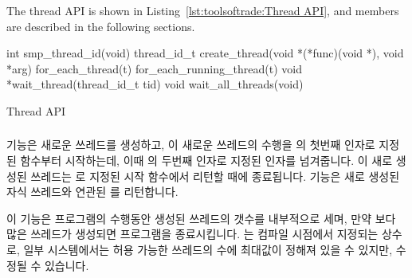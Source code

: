 The thread API is shown in
Listing~\ref{lst:toolsoftrade:Thread API}, and members are described in the
following sections.
\fi

\begin{listing*}[tbp]
{ \scriptsize
\begin{verbbox}
int smp_thread_id(void)
thread_id_t create_thread(void *(*func)(void *), void *arg)
for_each_thread(t)
for_each_running_thread(t)
void *wait_thread(thread_id_t tid)
void wait_all_threads(void)
\end{verbbox}
}
\centering
\theverbbox
\caption{Thread API}
\label{lst:toolsoftrade:Thread API}
\end{listing*}

\subsubsection{}

 기능은 새로운 쓰레드를 생성하고, 이 새로운 쓰레드의 수행을
 의 첫번째 인자로 지정된  함수부터 시작하는데,
이때  의 두번째 인자로 지정된 인자를 넘겨줍니다.
이 새로 생성된 쓰레드는  로 지정된 시작 함수에서 리턴할 때에
종료됩니다.
 기능은 새로 생성된 자식 쓰레드와 연관된 
를 리턴합니다.

이 기능은 프로그램의 수행동안 생성된 쓰레드의 갯수를 내부적으로 세며, 만약
 보다 많은 쓰레드가 생성되면 프로그램을 종료시킵니다.
 는 컴파일 시점에서 지정되는 상수로, 일부 시스템에서는 허용
가능한 쓰레드의 수에 최대값이 정해져 있을 수 있지만, 수정될 수 있습니다.

